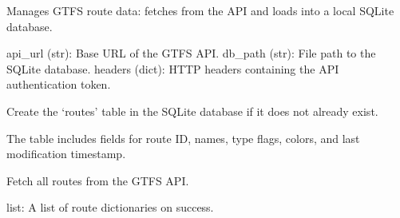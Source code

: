 \documentclass[letterpaper,10pt,english]{sphinxmanual}
\begin{document}
\label{\detokenize{api:module-managers.route_manager}}

\begin{fulllineitems}
\label{\detokenize{api:managers.route_manager.RouteManager}}
\pysigstartsignatures
{}
\pysigstopsignatures
\sphinxAtStartPar
Manages GTFS route data: fetches from the API and loads into a local SQLite database.
\begin{description}
\sphinxAtStartPar
api\_url (str): Base URL of the GTFS API.
db\_path (str): File path to the SQLite database.
headers (dict): HTTP headers containing the API authentication token.

\end{description}

\begin{fulllineitems}
\label{\detokenize{api:managers.route_manager.RouteManager.create_route_table}}
\pysigstartsignatures
{}
\pysigstopsignatures
\sphinxAtStartPar
Create the ‘routes’ table in the SQLite database if it does not already exist.

\sphinxAtStartPar
The table includes fields for route ID, names, type flags, colors, and last modification timestamp.

\end{fulllineitems}


\begin{fulllineitems}
\label{\detokenize{api:managers.route_manager.RouteManager.get_routes}}
\pysigstartsignatures
{}
\pysigstopsignatures
\sphinxAtStartPar
Fetch all routes from the GTFS API.
\begin{description}
\sphinxAtStartPar
list: A list of route dictionaries on success.


\end{description}
\end{fulllineitems}
\end{fulllineitems}
\end{document}
